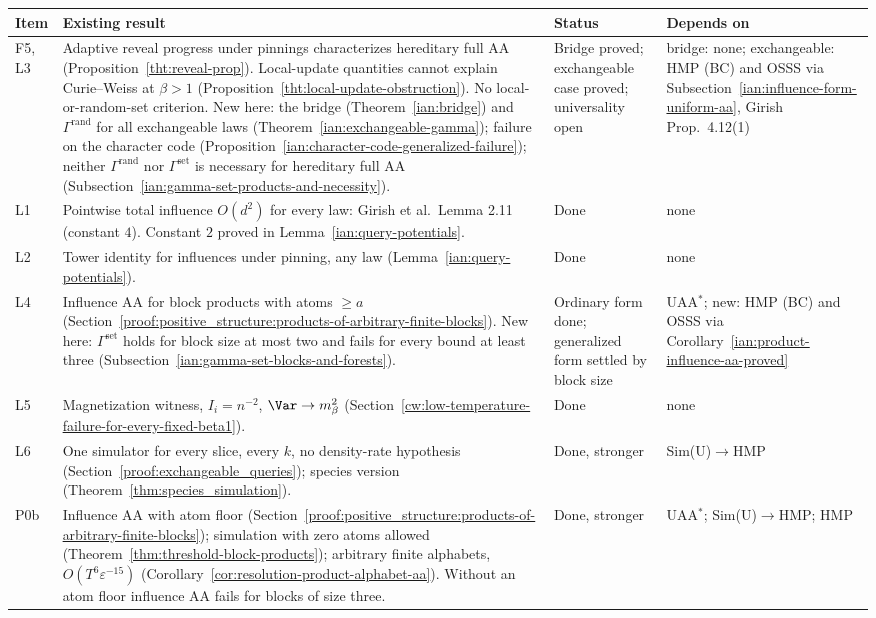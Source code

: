 \begin{longtable}{@{}p{}p{}p{}p{}@{}}
\toprule
Item & Existing result & Status & Depends on\\
\midrule
\endhead
F5, L3 & Adaptive reveal progress under pinnings characterizes hereditary full AA (Proposition~\ref{tht:reveal-prop}). Local-update quantities cannot explain Curie--Weiss at \(\beta>1\) (Proposition~\ref{tht:local-update-obstruction}). No local-or-random-set criterion. New here: the bridge (Theorem~\ref{ian:bridge}) and \(\Gamma^{\mathrm{rand}}\) for all exchangeable laws (Theorem~\ref{ian:exchangeable-gamma}); failure on the character code (Proposition~\ref{ian:character-code-generalized-failure}); neither \(\Gamma^{\mathrm{rand}}\) nor \(\Gamma^{\mathrm{set}}\) is necessary for hereditary full AA (Subsection~\ref{ian:gamma-set-products-and-necessity}). & Bridge proved; exchangeable case proved; universality open & bridge: none; exchangeable: HMP (BC) and OSSS via Subsection~\ref{ian:influence-form-uniform-aa}, Girish Prop.~4.12(1)\\
L1 & Pointwise total influence \(O(d^2)\) for every law: Girish et al.\ Lemma 2.11 (constant \(4\)). Constant \(2\) proved in Lemma~\ref{ian:query-potentials}. & Done & none\\
L2 & Tower identity for influences under pinning, any law (Lemma~\ref{ian:query-potentials}). & Done & none\\
L4 & Influence AA for block products with atoms \(\ge a\) (Section~\ref{proof:positive_structure:products-of-arbitrary-finite-blocks}). New here: \(\Gamma^{\mathrm{set}}\) holds for block size at most two and fails for every bound at least three (Subsection~\ref{ian:gamma-set-blocks-and-forests}). & Ordinary form done; generalized form settled by block size & UAA\(^*\); new: HMP (BC) and OSSS via Corollary~\ref{ian:product-influence-aa-proved}\\
L5 & Magnetization witness, \(I_i=n^{-2}\), \(\Var\to m_\beta^2\) (Section~\ref{cw:low-temperature-failure-for-every-fixed-beta1}). & Done & none\\
L6 & One simulator for every slice, every \(k\), no density-rate hypothesis (Section~\ref{proof:exchangeable_queries}); species version (Theorem~\ref{thm:species_simulation}). & Done, stronger & Sim(U)\(\to\)HMP\\
P0b & Influence AA with atom floor (Section~\ref{proof:positive_structure:products-of-arbitrary-finite-blocks}); simulation with zero atoms allowed (Theorem~\ref{thm:threshold-block-products}); arbitrary finite alphabets, \(O(T^6\varepsilon^{-15})\) (Corollary~\ref{cor:resolution-product-alphabet-aa}). Without an atom floor influence AA fails for blocks of size three. & Done, stronger & UAA\(^*\); Sim(U)\(\to\)HMP; HMP\\

\end{longtable}
